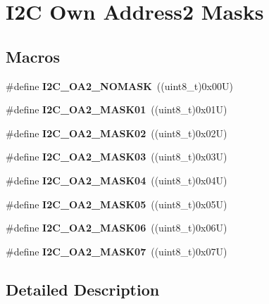 \hypertarget{group___i2_c___o_w_n___a_d_d_r_e_s_s2___m_a_s_k_s}{}\section{I2C Own Address2 Masks}
\label{group___i2_c___o_w_n___a_d_d_r_e_s_s2___m_a_s_k_s}
\subsection*{Macros}
\begin{DoxyCompactItemize}
\item 
\mbox{\label{group___i2_c___o_w_n___a_d_d_r_e_s_s2___m_a_s_k_s_ga3ca5e6cf8afdde67a7f1b8a0c796f9c9}} 
\#define {\bfseries I2\+C\+\_\+\+O\+A2\+\_\+\+N\+O\+M\+A\+SK}~((uint8\+\_\+t)0x00\+U)
\item 
\mbox{\label{group___i2_c___o_w_n___a_d_d_r_e_s_s2___m_a_s_k_s_gae6a0d4381368915b3a36235fd98bb8a4}} 
\#define {\bfseries I2\+C\+\_\+\+O\+A2\+\_\+\+M\+A\+S\+K01}~((uint8\+\_\+t)0x01\+U)
\item 
\mbox{\label{group___i2_c___o_w_n___a_d_d_r_e_s_s2___m_a_s_k_s_ga2306a30b54449efa6e21a1f8ee951f8d}} 
\#define {\bfseries I2\+C\+\_\+\+O\+A2\+\_\+\+M\+A\+S\+K02}~((uint8\+\_\+t)0x02\+U)
\item 
\mbox{\label{group___i2_c___o_w_n___a_d_d_r_e_s_s2___m_a_s_k_s_gac3e3c0ca814b770569cbfa51cace949f}} 
\#define {\bfseries I2\+C\+\_\+\+O\+A2\+\_\+\+M\+A\+S\+K03}~((uint8\+\_\+t)0x03\+U)
\item 
\mbox{\label{group___i2_c___o_w_n___a_d_d_r_e_s_s2___m_a_s_k_s_ga6b72221d08566e6c92efb029d4ee235e}} 
\#define {\bfseries I2\+C\+\_\+\+O\+A2\+\_\+\+M\+A\+S\+K04}~((uint8\+\_\+t)0x04\+U)
\item 
\mbox{\label{group___i2_c___o_w_n___a_d_d_r_e_s_s2___m_a_s_k_s_gafe58a35152ba38ddc639402f20d35471}} 
\#define {\bfseries I2\+C\+\_\+\+O\+A2\+\_\+\+M\+A\+S\+K05}~((uint8\+\_\+t)0x05\+U)
\item 
\mbox{\label{group___i2_c___o_w_n___a_d_d_r_e_s_s2___m_a_s_k_s_gab25ccebde410e4481356cb115dd170ff}} 
\#define {\bfseries I2\+C\+\_\+\+O\+A2\+\_\+\+M\+A\+S\+K06}~((uint8\+\_\+t)0x06\+U)
\item 
\mbox{\label{group___i2_c___o_w_n___a_d_d_r_e_s_s2___m_a_s_k_s_gaa86f61452707ac8b4054a3bc2127ed97}} 
\#define {\bfseries I2\+C\+\_\+\+O\+A2\+\_\+\+M\+A\+S\+K07}~((uint8\+\_\+t)0x07\+U)
\end{DoxyCompactItemize}


\subsection{Detailed Description}
